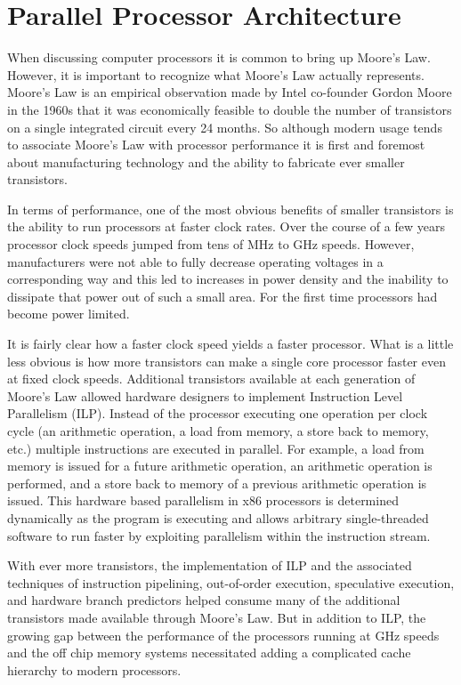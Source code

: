 \documentclass{JINST}
\begin{document}
\section{Parallel Processor Architecture}

When discussing computer processors it is common to bring up Moore's Law.  However, it is important to recognize what Moore's Law actually represents.  Moore's Law is an empirical observation made by Intel co-founder Gordon Moore in the 1960s that it was economically feasible to double the number of transistors on a single integrated circuit every 24 months.  So although modern usage tends to associate Moore's Law with processor performance it is first and foremost about manufacturing technology and the ability to fabricate ever smaller transistors.

In terms of performance, one of the most obvious benefits of smaller transistors is the ability to run processors at faster clock rates.  Over the course of a few years processor clock speeds jumped from tens of MHz to GHz speeds.  However, manufacturers were not able to fully decrease operating voltages in a corresponding way and this led to increases in power density and the inability to dissipate that power out of such a small area.  For the first time processors had become power limited.

It is fairly clear how a faster clock speed yields a faster processor.  What is a little less obvious is how more transistors can make a single core processor faster even at fixed clock speeds.  Additional transistors available at each generation of Moore's Law allowed hardware designers to implement Instruction Level Parallelism (ILP).  Instead of the processor executing one operation per clock cycle (an arithmetic operation, a load from memory, a store back to memory, etc.) multiple instructions are executed in parallel.  For example, a load from memory is issued for a future arithmetic operation, an arithmetic operation is performed, and a store back to memory of a previous arithmetic operation is issued.  This hardware based parallelism in x86 processors is determined dynamically as the program is executing and allows arbitrary single-threaded software to run faster by exploiting parallelism within the instruction stream.

With ever more transistors, the implementation of ILP and the associated techniques of instruction pipelining, out-of-order execution, speculative execution, and hardware branch predictors helped consume many of the additional transistors made available through Moore's Law.  But in addition to ILP, the growing gap between the performance of the processors running at GHz speeds and the off chip memory systems necessitated adding a complicated cache hierarchy to modern processors.
\end{document}
